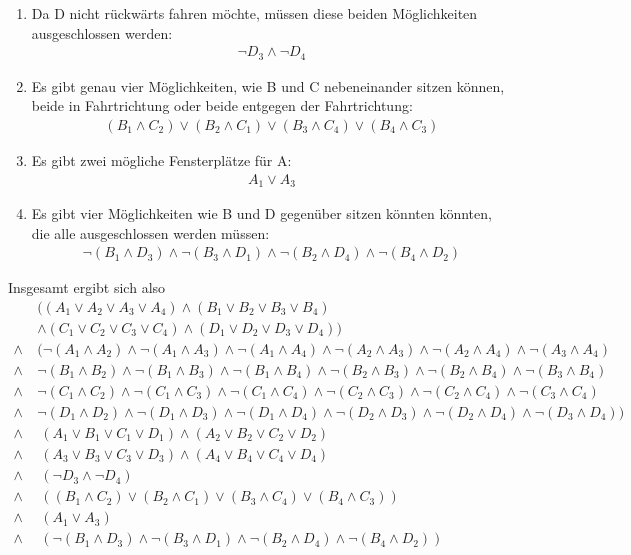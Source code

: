 \documentclass[a4paper,10pt]{article}
\begin{document}
\begin{enumerate}
\item Da D nicht rückwärts fahren möchte, müssen diese beiden Möglichkeiten ausgeschlossen werden:
\begin{align*}
\neg D_3 \wedge \neg D_4
\end{align*}

\item Es gibt genau vier Möglichkeiten, wie B und C nebeneinander sitzen können, beide in Fahrtrichtung oder beide entgegen der Fahrtrichtung:
\begin{align*}
(B_1 \wedge C_2) \vee (B_2 \wedge C_1) \vee (B_3 \wedge C_4) \vee (B_4 \wedge C_3)
\end{align*}

\item Es gibt zwei mögliche Fensterplätze für A:
\begin{align*}
A_1 \vee A_3
\end{align*}

\item Es gibt vier Möglichkeiten wie B und D gegenüber sitzen könnten könnten, die alle ausgeschlossen werden müssen:
\begin{align*}
\neg(B_1 \wedge D_3) \wedge \neg(B_3 \wedge D_1) \wedge \neg(B_2 \wedge D_4) \wedge \neg(B_4 \wedge D_2)
\end{align*}
\end{enumerate}
Insgesamt ergibt sich also
\begin{align*}
& ((A_1 \vee A_2 \vee A_3 \vee A_4) \wedge (B_1 \vee B_2 \vee B_3 \vee B_4) \\ & \wedge (C_1 \vee C_2 \vee C_3 \vee C_4) \wedge (D_1 \vee D_2 \vee D_3 \vee D_4)) \\
\wedge ~ & (\neg(A_1 \wedge A_2) \wedge \neg (A_1 \wedge A_3) \wedge \neg (A_1 \wedge A_4) \wedge \neg (A_2 \wedge A_3) \wedge \neg (A_2 \wedge A_4) \wedge \neg (A_3 \wedge A_4) \\
\wedge~ & \neg(B_1 \wedge B_2) \wedge \neg (B_1 \wedge B_3) \wedge \neg (B_1 \wedge B_4) \wedge \neg (B_2 \wedge B_3) \wedge \neg (B_2 \wedge B_4) \wedge \neg (B_3 \wedge B_4) \\
\wedge~ & \neg(C_1 \wedge C_2) \wedge \neg (C_1 \wedge C_3) \wedge \neg (C_1 \wedge C_4) \wedge \neg (C_2 \wedge C_3) \wedge \neg (C_2 \wedge C_4) \wedge \neg (C_3 \wedge C_4) \\
\wedge~ & \neg(D_1 \wedge D_2) \wedge \neg (D_1 \wedge D_3) \wedge \neg (D_1 \wedge D_4) \wedge \neg (D_2 \wedge D_3) \wedge \neg (D_2 \wedge D_4) \wedge \neg (D_3 \wedge D_4)) \\
\wedge & ~ (A_1 \vee B_1 \vee C_1 \vee D_1) \wedge (A_2 \vee B_2 \vee C_2 \vee D_2) \\\wedge & ~(A_3 \vee B_3 \vee C_3 \vee D_3) \wedge (A_4 \vee B_4 \vee C_4 \vee D_4) \\
\wedge & ~ (\neg D_3 \wedge \neg D_4) \\
\wedge & ~ ((B_1 \wedge C_2) \vee (B_2 \wedge C_1) \vee (B_3 \wedge C_4) \vee (B_4 \wedge C_3)) \\
\wedge & ~ (A_1 \vee A_3) \\
\wedge & ~ (\neg(B_1 \wedge D_3) \wedge \neg(B_3 \wedge D_1) \wedge \neg(B_2 \wedge D_4) \wedge \neg(B_4 \wedge D_2))
\end{align*} 
\end{document}

